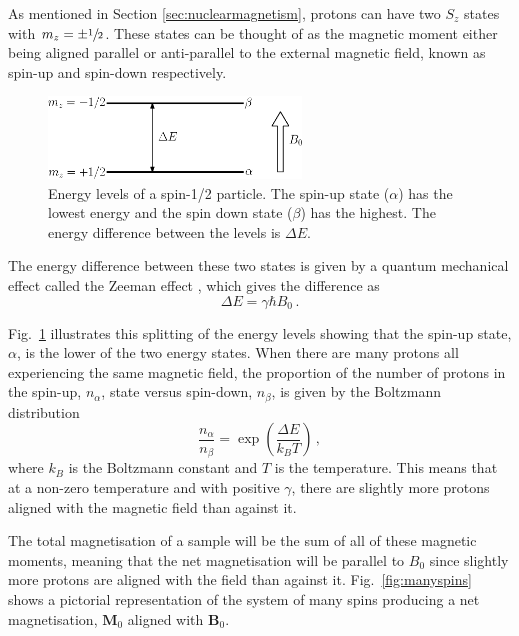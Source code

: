 As mentioned in Section \ref{sec:nuclearmagnetism}, protons can have two $S_z$ states with $m_z = \pm \sfrac{1}{2}$. 
These states can be thought of as the magnetic moment either being aligned parallel or anti-parallel to the external magnetic field, known as spin-up and spin-down respectively.

\begin{figure}
	\centering
	\includegraphics[width=0.6\textwidth]{figures/background/energy_levels.eps}
	\caption{Energy levels of a spin-1/2 particle. The spin-up state ($\alpha$) has the lowest energy and the spin down state ($\beta$) has the highest. The energy difference between the levels is $\Delta E$.}
	\label{fig:energylevels}
\end{figure}

The energy difference between these two states is given by a quantum mechanical effect called the Zeeman effect \cite{Levitt2008}, which gives the difference as  
\begin{equation}
	\Delta E = \gamma \hbar B_0\,.
\end{equation} 

Fig.\ \ref{fig:energylevels} illustrates this splitting of the energy levels showing that the spin-up state, $\alpha$, is the lower of the two energy states. 
When there are many protons all experiencing the same magnetic field, the proportion of the number of protons in the spin-up, $n_\alpha$, state versus spin-down, $n_\beta$, is given by the Boltzmann distribution\cite{DeGraaf2007}
\begin{equation}
\frac{n_\alpha}{n_\beta} = \exp\left(\frac{\Delta E}{k_BT}\right)\,,
\end{equation}  
where $k_B$ is the Boltzmann constant and $T$ is the temperature. This means that at a non-zero temperature and with positive $\gamma$, there are slightly more protons aligned with the magnetic field than against it.  

The total magnetisation of a sample will be the sum of all of these magnetic moments, meaning that the net magnetisation will be parallel to $B_0$ since slightly more protons are aligned with the field than against it. 
Fig.\ \ref{fig:manyspins} shows a pictorial representation of the system of many spins producing a net magnetisation, $\mathbf{M}_0$ aligned with $\mathbf{B}_0$.

